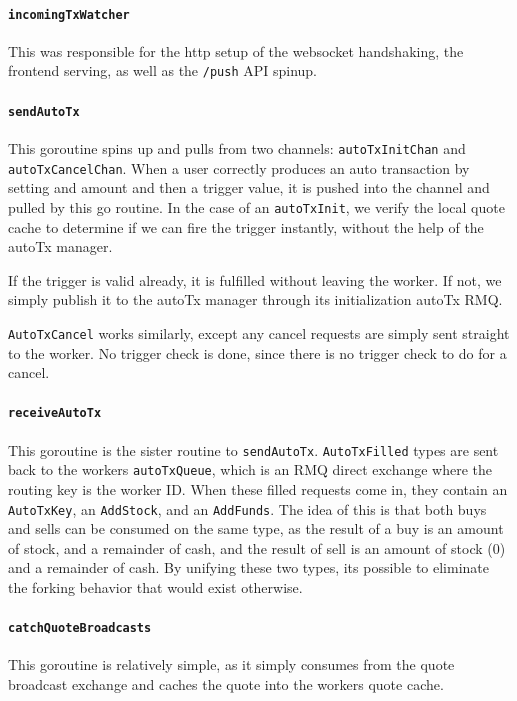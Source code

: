 \paragraph{\texttt{incomingTxWatcher}}
This was responsible for the http setup of the websocket handshaking, the frontend serving, as well as the \texttt{/push} API spinup.

\paragraph{\texttt{sendAutoTx}}
This goroutine spins up and pulls from two channels: \texttt{autoTxInitChan} and \texttt{autoTxCancelChan}. When a user correctly produces an auto transaction by setting and amount and then a trigger value, it is pushed into the channel and pulled by this go routine. In the case of an \texttt{autoTxInit}, we verify the local quote cache to determine if we can fire the trigger instantly, without the help of the autoTx manager.

If the trigger is valid already, it is fulfilled without leaving the worker. If not, we simply publish it to the autoTx manager through its initialization autoTx RMQ.

\texttt{AutoTxCancel} works similarly, except any cancel requests are simply sent straight to the worker. No trigger check is done, since there is no trigger check to do for a cancel.

\paragraph{\texttt{receiveAutoTx}}
This goroutine is the sister routine to \texttt{sendAutoTx}. \texttt{AutoTxFilled} types are sent back to the workers \texttt{autoTxQueue}, which is an RMQ direct exchange where the routing key is the worker ID. When these filled requests come in, they contain an \texttt{AutoTxKey}, an \texttt{AddStock}, and an \texttt{AddFunds}. The idea of this is that both buys and sells can be consumed on the same type, as the result of a buy is an amount of stock, and a remainder of cash, and the result of sell is an amount of stock (0) and a remainder of cash. By unifying these two types, its possible to eliminate the forking behavior that would exist otherwise.

\paragraph{\texttt{catchQuoteBroadcasts}}
This goroutine is relatively simple, as it simply consumes from the quote broadcast exchange and caches the quote into the workers quote cache.

